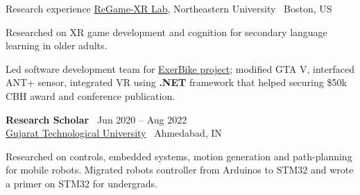 \documentclass{resume}
\begin{document}
\begin{rSection}{Research experience}
{\href{https://regamexr.sites.northeastern.edu/}{ReGame-XR Lab}, Northeastern University} \hfill {\ {Boston, US}}
\begin{cvitems}
    \item Researched on XR game development and cognition for secondary language learning in older adults.
    \item Led software development team for \href{https://games.northeastern.edu/project/exerbike/}{ExerBike project}; modified GTA V, interfaced ANT+ sensor, integrated VR using \textbf{.NET} framework that helped securing \$50k CBH award and conference publication.
\end{cvitems}
{\bf Research Scholar} \hfill {\ Jun 2020 -- Aug 2022 }\\ 
{\href{https://www.gtu.ac.in/}{Gujarat Technological University}} \hfill {\ {Ahmedabad, IN}}
\begin{cvitems}
    \item Researched on controls, embedded systems, motion generation and path-planning for mobile robots. Migrated robots controller from Arduinos to STM32 and wrote a primer on STM32 for undergrads.
\end{cvitems}
\end{rSection}
\end{document}
